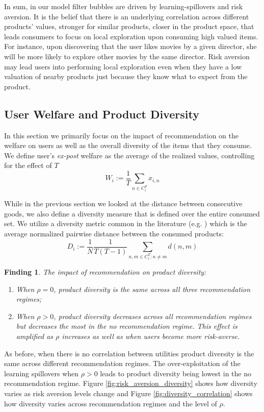 \documentclass[sigconf, anonymous, review]{acmart}
\newtheorem{finding}{Finding}
\begin{document}
In sum, in our model filter bubbles are driven by learning-spillovers and risk aversion. It is the belief that there is an underlying correlation across different products' values, stronger for similar products, closer in the product space, that leads consumers to focus on local exploration upon consuming high valued items. For instance, upon discovering that the user likes movies by a given director, she will be more likely to explore other movies by the same director. Risk aversion may lead users into performing local exploration even when they have a low valuation of nearby products just because they know what to expect from the product.
\par

\subsection{User Welfare and Product Diversity}
In this section we primarily focus on the impact of recommendation on the welfare on users as well as the overall diversity of the items that they consume. We define user's \textit{ex-post} welfare as the average of the realized values, controlling for the effect of $T$
$$W_i:= \frac{1}{T}\sum_{n \in C_i^T} x_{i,n}$$

While in the previous section we looked at the distance between consecutive goods, we also define a diversity measure that is defined over the entire consumed set. We utilize a diversity metric common in the literature (e.g. \cite{ziegler2005improving}) which is the average normalized pairwise distance between the consumed products:
$$D_i:=\frac{1}{N}\frac{1}{T(T-1)}\sum_{n,m \in C_i^T: n \ne m} d(n,m)$$

\begin{finding}\label{finding_diversity}
The impact of recommendation on product diversity:
\begin{enumerate}
\item When $\rho = 0$, product diversity is the same across all three recommendation regimes;
\item When $\rho > 0$, product diversity decreases across all recommendation regimes but decreases the most in the no recommendation regime. This effect is amplified as $\rho$ increases as well as when users become more risk-averse.
\end{enumerate}
\end{finding}

As before, when there is no correlation between utilities product diversity is the same across different recommendation regimes. The over-exploitation of the learning spillovers when $\rho > 0$ leads to product diversity being lowest in the no recommendation regime.  Figure \ref{fig:risk_aversion_diversity} shows how diversity varies as risk aversion levels change and Figure \ref{fig:diversity_correlation} shows how diversity varies across recommendation regimes and the level of $\rho$.
\end{document}
